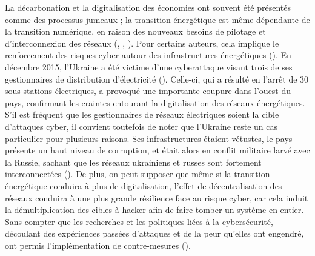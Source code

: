 La décarbonation et la digitalisation des économies ont souvent été présentés comme des processus jumeaux ; la transition énergétique est même dépendante de la transition numérique, en raison des nouveaux besoins de pilotage et d'interconnexion des réseaux (\cite{iea_digitalization_2017}, \cite{commission_europeenne_twin_2022}, \cite{unep_digitalisation_2021}). Pour certains auteurs, cela implique le renforcement des risques cyber autour des infrastructures énergétiques (\cite{eyl-mazzega_dimension_2019}). En décembre 2015, l'Ukraine a été victime d'une cyberattaque visant trois de ses gestionnaires de distribution d'électricité (\cite{zetter_inside_2016}). Celle-ci, qui a résulté en l'arrêt de 30 sous-stations électriques, a provoqué une importante coupure dans l'ouest du pays, confirmant les craintes entourant la digitalisation des réseaux énergétiques. S'il est fréquent que les gestionnaires de réseaux électriques soient la cible d'attaques cyber, il convient toutefois de noter que l'Ukraine reste un cas particulier pour plusieurs raisons. Ses infrastructures étaient vétustes, le pays présente un haut niveau de corruption, et était alors en conflit militaire larvé avec la Russie, sachant que les réseaux ukrainiens et russes sont fortement interconnectées (\cite{overland_geopolitics_2019}).
\smallbreak
De plus, on peut supposer que même si la transition énergétique conduira à plus de digitalisation, l'effet de décentralisation des réseaux conduira à une plus grande résilience face au risque cyber, car cela induit la démultiplication des cibles à hacker afin de faire tomber un système en entier. Sans compter que les recherches et les politiques liées à la cybersécurité, découlant des expériences passées d'attaques et de la peur qu'elles ont engendré, ont permis l'implémentation de contre-mesures (\cite{overland_geopolitics_2019}).